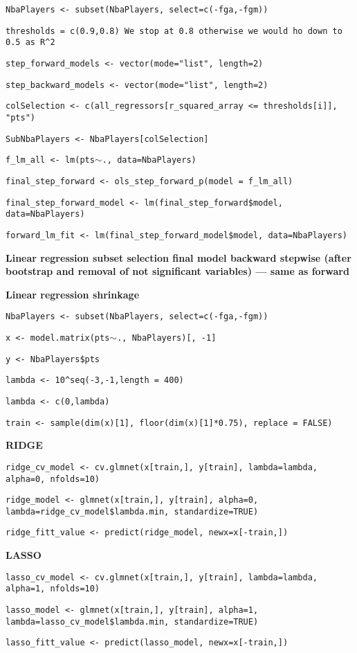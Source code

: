 \begin{center}
\texttt{NbaPlayers <- subset(NbaPlayers, select=c(-fga,-fgm))}

\texttt{thresholds = c(0.9,0.8) We stop at 0.8 otherwise we would ho down to 0.5 as R\^{}2}

\texttt{step\_forward\_models <- vector(mode="list", length=2)}

\texttt{step\_backward\_models <- vector(mode="list", length=2)}

\texttt{colSelection <- c(all\_regressors[r\_squared\_array <= thresholds[i]], "pts")}

\texttt{SubNbaPlayers <- NbaPlayers[colSelection]}

\texttt{f\_lm\_all <- lm(pts$\sim$., data=NbaPlayers)}

\texttt{final\_step\_forward <- ols\_step\_forward\_p(model = f\_lm\_all)}

\texttt{final\_step\_forward\_model <- lm(final\_step\_forward\$model, data=NbaPlayers)}

\texttt{forward\_lm\_fit <- lm(final\_step\_forward\_model\$model, data=NbaPlayers)}
\end{center}
	
\noindent
\textbf{Linear regression subset selection final model backward stepwise (after bootstrap and removal of not significant variables) --- same as forward}

\noindent
\textbf{Linear regression shrinkage}

\begin{center}
\texttt{NbaPlayers <- subset(NbaPlayers, select=c(-fga,-fgm))}

\texttt{x <- model.matrix(pts$\sim$., NbaPlayers)[, -1]}

\texttt{y <- NbaPlayers\$pts}

\texttt{lambda <- 10\^{}seq(-3,-1,length = 400)}

\texttt{lambda <- c(0,lambda)}

\texttt{train <- sample(dim(x)[1], floor(dim(x)[1]*0.75), replace = FALSE)}
\end{center}
	
\textbf{RIDGE}

\begin{center}
\texttt{ridge\_cv\_model <- cv.glmnet(x[train,], y[train], lambda=lambda, alpha=0, nfolds=10)}

\texttt{ridge\_model <- glmnet(x[train,], y[train], alpha=0, lambda=ridge\_cv\_model\$lambda.min, standardize=TRUE)}

\texttt{ridge\_fitt\_value <- predict(ridge\_model, newx=x[-train,])}
\end{center}
	
\textbf{LASSO}

\begin{center}
\texttt{lasso\_cv\_model <- cv.glmnet(x[train,], y[train], lambda=lambda, alpha=1, nfolds=10)}

\texttt{lasso\_model <- glmnet(x[train,], y[train], alpha=1, lambda=lasso\_cv\_model\$lambda.min, standardize=TRUE)}

\texttt{lasso\_fitt\_value <- predict(lasso\_model, newx=x[-train,])}
\end{center}